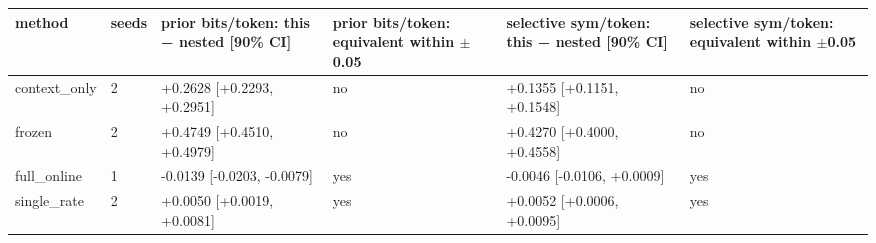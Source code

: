 \begin{tabular}{llllll}
\hline
method & seeds & prior bits/token: this − nested [90\% CI] & prior bits/token: equivalent within $\pm$0.05 & selective sym/token: this − nested [90\% CI] & selective sym/token: equivalent within $\pm$0.05 \\
\hline
context\_only & 2 & +0.2628 [+0.2293, +0.2951] & no & +0.1355 [+0.1151, +0.1548] & no \\
frozen & 2 & +0.4749 [+0.4510, +0.4979] & no & +0.4270 [+0.4000, +0.4558] & no \\
full\_online & 1 & -0.0139 [-0.0203, -0.0079] & yes & -0.0046 [-0.0106, +0.0009] & yes \\
single\_rate & 2 & +0.0050 [+0.0019, +0.0081] & yes & +0.0052 [+0.0006, +0.0095] & yes \\
\hline
\end{tabular}
